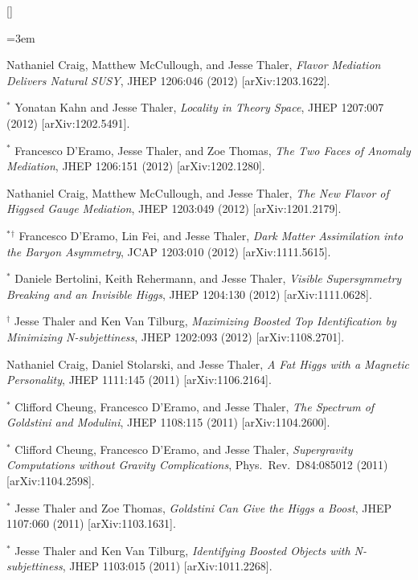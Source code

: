 \begin{list}{[]\addtocounter{jessecount}{-1}}{\leftmargin=3em \itemsep=4pt}
\item
 Nathaniel Craig, Matthew McCullough, and Jesse Thaler,
\emph{Flavor Mediation Delivers Natural SUSY},
JHEP 1206:046 (2012)
[arXiv:1203.1622].

\item
${}^\ast$ Yonatan Kahn and Jesse Thaler,
\emph{Locality in Theory Space},
JHEP 1207:007 (2012)
[arXiv:1202.5491].

\item
${}^\ast$ Francesco D'Eramo, Jesse Thaler, and Zoe Thomas,
\emph{The Two Faces of Anomaly Mediation},
JHEP 1206:151 (2012)
[arXiv:1202.1280].

\item
 Nathaniel Craig, Matthew McCullough, and Jesse Thaler,
\emph{The New Flavor of Higgsed Gauge Mediation},
JHEP 1203:049 (2012)
[arXiv:1201.2179].

\item
${}^\ast$${}^\dagger$ Francesco D'Eramo, Lin Fei, and Jesse Thaler,
\emph{Dark Matter Assimilation into the Baryon Asymmetry},
JCAP 1203:010 (2012)
[arXiv:1111.5615].

\item
${}^\ast$ Daniele Bertolini, Keith Rehermann, and Jesse Thaler,
\emph{Visible Supersymmetry Breaking and an Invisible Higgs},
JHEP 1204:130 (2012)
[arXiv:1111.0628].

\item
${}^\dagger$ Jesse Thaler and Ken Van Tilburg,
\emph{Maximizing Boosted Top Identification by Minimizing N-subjettiness},
JHEP 1202:093 (2012)
[arXiv:1108.2701].

\item
 Nathaniel Craig, Daniel Stolarski, and Jesse Thaler,
\emph{A Fat Higgs with a Magnetic Personality},
JHEP 1111:145 (2011)
[arXiv:1106.2164].

\item
${}^\ast$ Clifford Cheung, Francesco D'Eramo, and Jesse Thaler,
\emph{The Spectrum of Goldstini and Modulini},
JHEP 1108:115 (2011)
[arXiv:1104.2600].

\item
${}^\ast$ Clifford Cheung, Francesco D'Eramo, and Jesse Thaler,
\emph{Supergravity Computations without Gravity Complications},
Phys.\ Rev.\ D84:085012 (2011)
[arXiv:1104.2598].

\item
${}^\ast$ Jesse Thaler and Zoe Thomas,
\emph{Goldstini Can Give the Higgs a Boost},
JHEP 1107:060 (2011)
[arXiv:1103.1631].

\item
${}^\ast$ Jesse Thaler and Ken Van Tilburg,
\emph{Identifying Boosted Objects with N-subjettiness},
JHEP 1103:015 (2011)
[arXiv:1011.2268].


\end{list}
